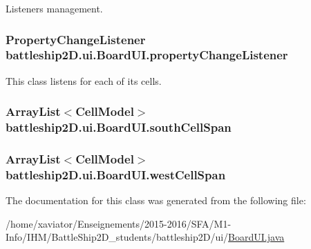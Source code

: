 Listeners management. 

\hypertarget{classbattleship2D_1_1ui_1_1BoardUI_a457c5910efd06093f84977cd1e464891}{
\subsubsection[{property\-Change\-Listener}]{\setlength{\rightskip}{0pt plus 5cm}Property\-Change\-Listener battleship2\-D.\-ui.\-Board\-U\-I.\-property\-Change\-Listener\hspace{0.3cm}{\ttfamily [protected]}}}\label{classbattleship2D_1_1ui_1_1BoardUI_a457c5910efd06093f84977cd1e464891}


This class listens for each of its cells. 

\hypertarget{classbattleship2D_1_1ui_1_1BoardUI_ac295e84c64a347a4d374f70948ea7080}{
\subsubsection[{south\-Cell\-Span}]{\setlength{\rightskip}{0pt plus 5cm}Array\-List$<${\bf Cell\-Model}$>$ battleship2\-D.\-ui.\-Board\-U\-I.\-south\-Cell\-Span\hspace{0.3cm}{\ttfamily [package]}}}\label{classbattleship2D_1_1ui_1_1BoardUI_ac295e84c64a347a4d374f70948ea7080}
\hypertarget{classbattleship2D_1_1ui_1_1BoardUI_a0be656b4f354cb96b52ccd53ea6b7eb8}{
\subsubsection[{west\-Cell\-Span}]{\setlength{\rightskip}{0pt plus 5cm}Array\-List$<${\bf Cell\-Model}$>$ battleship2\-D.\-ui.\-Board\-U\-I.\-west\-Cell\-Span\hspace{0.3cm}{\ttfamily [package]}}}\label{classbattleship2D_1_1ui_1_1BoardUI_a0be656b4f354cb96b52ccd53ea6b7eb8}


The documentation for this class was generated from the following file\-:\begin{DoxyCompactItemize}
\item 
/home/xaviator/\-Enseignements/2015-\/2016/\-S\-F\-A/\-M1-\/\-Info/\-I\-H\-M/\-Battle\-Ship2\-D\-\_\-students/battleship2\-D/ui/\hyperlink{BoardUI_8java}{Board\-U\-I.\-java}\end{DoxyCompactItemize}

